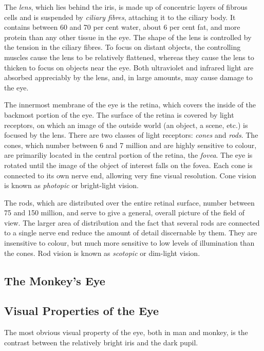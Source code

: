 
The {\em lens\/}, which lies behind the iris, is made up of concentric
layers of fibrous cells and is suspended by {\em ciliary fibres\/},
attaching it to the ciliary body.  It contains between 60 and 70 per
cent water, about 6 per cent fat, and more protein than any other
tissue in the eye.  The shape of the lens is controlled by the tension
in the ciliary fibres.  To focus on distant objects, the controlling
muscles cause the lens to be relatively flattened, whereas they cause
the lens to thicken to focus on objects near the eye.  Both
ultraviolet and infrared light are absorbed appreciably by the lens,
and, in large amounts, may cause damage to the eye.

The innermost membrane of the eye is the retina, which covers the
inside of the backmost portion of the eye.  The surface of the retina
is covered by light receptors, on which an image of the outside world
(an object, a scene, etc.) is focused by the lens.  There are two
classes of light receptors: {\em cones\/} and {\em rods\/}.  The
cones, which number between 6 and 7 million and are highly sensitive
to colour, are primariliy located in the central portion of the
retina, the {\em fovea\/}.  The eye is rotated until the image of the
object of interest falls on the fovea.  Each cone is connected to its
own nerve end, allowing very fine visual resolution.  Cone vision is
known as {\em photopic\/} or bright-light vision.

The rods, which are distributed over the entire retinal surface,
number between 75 and 150 million, and serve to give a general,
overall picture of the field of view.  The larger area of distribution
and the fact that several rods are connected to a single nerve end
reduce the amount of detail discernable by them.  They are insensitive
to colour, but much more sensitive to low levels of illumination than
the cones.  Rod vision is known as {\em scotopic\/} or dim-light
vision.

\subsection{The Monkey's Eye}
\label{back:eye:monkey}

\subsection{Visual Properties of the Eye}
\label{back:eye:visual}

The most obvious visual property of the eye, both in man and monkey,
is the contrast between the relatively bright iris and the dark pupil.
